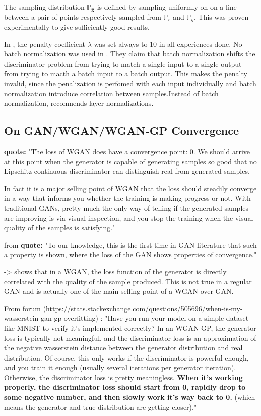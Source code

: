 \documentclass{article}
\begin{document}
The sampling distribution $\mathbb{P}_{\hat{\mathbf{x}}}$ is defined by sampling uniformly on on a line between a pair of points respectively sampled from $\mathbb{P}_{r}$ and $\mathbb{P}_{g}$. This was proven experimentally to give sufficiently good results.

In \cite{DBLP:journals/corr/GulrajaniAADC17}, the penalty coefficient $\lambda$ was set always to 10 in all experiences done. No batch normalization was used in \cite{DBLP:journals/corr/GulrajaniAADC17}. They claim that batch normalization shifts the discriminator problem from trying to match a single input to a single output from trying to macth a batch input to a batch output. This makes the penalty invalid, since the penalization is perfomed with each input individually and batch normalization introduce correlation between samples.Instead of batch normalization, \cite{DBLP:journals/corr/GulrajaniAADC17} recomnends layer normalizations.

\subsection{On GAN/WGAN/WGAN-GP Convergence}



\textbf{quote:} "The loss of WGAN does have a convergence point: 0. We should arrive at this point when the generator is capable of generating samples so good that no Lipschitz continuous discriminator can distinguish real from generated samples.

In fact it is a major selling point of WGAN that the loss should steadily converge in a way that informs you whether the training is making progress or not. With traditional GANs, pretty much the only way of telling if the generated samples are improving is via visual inspection, and you stop the training when the visual quality of the samples is satisfying."


from \cite{arjovsky2017wasserstein} \textbf{quote:} "To our knowledge, this is the first time in GAN literature that such a property is shown, where the loss of the GAN shows properties of convergence."

-> \cite{arjovsky2017wasserstein} shows that in a WGAN, the loss function of the generator is directly correlated with the quality of the sample produced. This is not true in a regular GAN and is actually one of the main selling point of a WGAN over GAN.

From forum (https://stats.stackexchange.com/questions/505696/when-is-my-wasserstein-gan-gp-overfitting) : "Have you run your model on a simple dataset like MNIST to verify it's implemented correctly? In an WGAN-GP, the generator loss is typically not meaningful, and the discriminator loss is an approximation of the negative wasserstein distance between the generator distribution and real distribution. Of course, this only works if the discriminator is powerful enough, and you train it enough (usually several iterations per generator iteration). Otherwise, the discriminator loss is pretty meaningless. \textbf{When it's working properly, the discriminator loss should start from 0, rapidly drop to some negative number, and then slowly work it's way back to 0.} (which means the generator and true distribution are getting closer)." 
\end{document}
